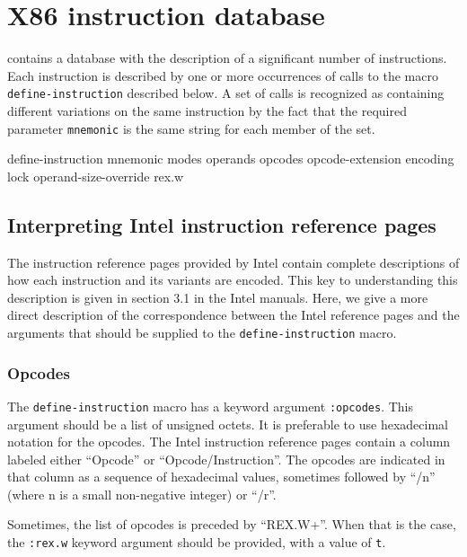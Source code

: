 \chapter{X86 instruction database}

\sysname{} contains a database with the description of a significant
number of instructions.  Each instruction is described by one or more
occurrences of calls to the macro \texttt{define-instruction}
described below.  A set of calls is recognized as containing different
variations on the same instruction by the fact that the required
parameter \texttt{mnemonic} is the same string for each member of the
set.

 define-instruction {mnemonic \key 
				       modes
				       operands
				       opcodes
				       opcode-extension
				       encoding
				       lock
				       operand-size-override
				       rex.w}

\section{Interpreting Intel instruction reference pages}

The instruction reference pages provided by Intel contain complete
descriptions of how each instruction and its variants are encoded.
This key to understanding this description is given in section 3.1 in
the Intel manuals.  Here, we give a more direct description of the
correspondence between the Intel reference pages and the arguments
that should be supplied to the \texttt{define-instruction} macro.

\subsection{Opcodes}

The \texttt{define-instruction} macro has a keyword argument
\texttt{:opcodes}.  This argument should be a list of unsigned octets.
It is preferable to use hexadecimal notation for the opcodes.  The
Intel instruction reference pages contain a column labeled either
``Opcode'' or ``Opcode/Instruction''.  The opcodes are indicated in
that column as a sequence of hexadecimal values, sometimes followed by
``/n'' (where n is a small non-negative integer) or ``/r''.

Sometimes, the list of opcodes is preceded by ``REX.W+''.  When that
is the case, the \texttt{:rex.w} keyword argument should be provided,
with a value of \texttt{t}.
